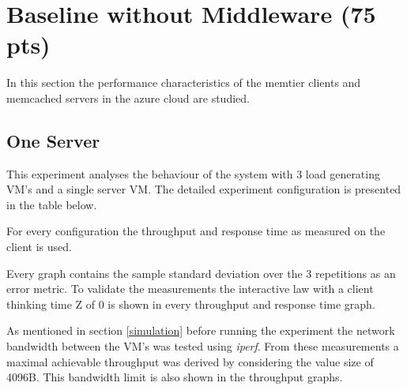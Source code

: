 \documentclass[report.tex]{subfiles}
\begin{document}
\section{Baseline without Middleware (75 pts)}\label{exp2}

In this section the performance characteristics of the memtier clients and memcached servers in the azure cloud are studied.

\subsection{One Server}\label{exp21}



This experiment analyses the behaviour of the system with 3 load generating VM's and a single server VM. The detailed experiment configuration is presented in the table below.

For every configuration the throughput and response time as measured on the client is used.

Every graph contains the sample standard deviation over the 3 repetitions as an error metric.
To validate the measurements the interactive law with a client thinking time Z of 0 is shown in every throughput and response time graph.

As mentioned in section \ref{simulation} before running the experiment the network bandwidth between the VM's was tested using \emph{iperf}. From these measurements a maximal achievable throughput was derived by considering the value size of 4096B. This bandwidth limit is also shown in the throughput graphs.
\end{document}
